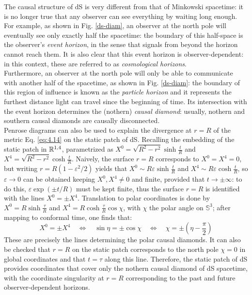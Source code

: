 The causal structure of dS is very different from that of Minkowski spacetime: it is no longer true that any observer can see everything by waiting long enough. For example, as shown in Fig. \ref{ds-diam}, an observer at the north pole will eventually see only exactly half the spacetime: the boundary of this half-space is the observer's \textit{event horizon}, in the sense that signals from beyond the horizon cannot reach them. It is also clear that this event horizon is observer-dependent: in this context, these are referred to as \textit{cosmological horizons}.\\
Furthermore, an observer at the north pole will only be able to communicate with another half of the spacetime, as shown in Fig. \ref{ds-diam}: the boundary of this region of influence is known as the \textit{particle horizon} and it represents the furthest distance light can travel since the beginning of time. Its intersection with the event horizon determines the (nothern) \textit{causal diamond}: usually, nothern and southern causal diamonds are causally disconnected.\\
Penrose diagrams can also be used to explain the divergence at $ r = R $ of the metric Eq. \ref{eq:4.14} on the static patch of dS. Recalling the embedding of the static patch in $ \mathbb{R}^{1,4} $, parametrized as $ X^0 = \sqrt{R^2 - r^2} \sinh \frac{t}{R} $ and $ X^4 = \sqrt{R^2 - r^2} \cosh \frac{t}{R} $. Naively, the surface $ r = R $ corresponds to $ X^0 = X^4 = 0 $, but writing $ r = R ( 1 - \varepsilon^2 / 2) $ yields that $ X^0 \sim R \varepsilon \sinh \frac{t}{R} $ and $ X^4 \sim R \varepsilon \cosh \frac{t}{R} $, so $ \varepsilon \rightarrow 0 $ can be obtained keeping $ X^0, X^4 \neq 0 $ and finite, provided that $ t \rightarrow \pm \infty $: to do this, $ \varepsilon \exp (\pm t / R) $ must be kept finite, thus the surface $ r = R $ is identified with the lines $ X^0 = \pm X^4 $. Translation to polar coordinates is done by $ X^0 = R \sinh \frac{\tau}{R} $ and $ X^4 = R \cosh \frac{\tau}{R} \cos \chi $, with $ \chi $ the polar angle on $ \mathbb{S}^3 $; after mapping to conformal time, one finds that:
\begin{equation*}
  X^0 = \pm X^4
  \quad \Leftrightarrow \quad
  \sin \eta = \pm \cos \chi
  \quad \Leftrightarrow \quad
  \chi = \pm \left( \eta - \frac{\pi}{2} \right)
\end{equation*}
These are precisely the lines determining the polar causal diamonds. It can also be checked that $ r = R $ on the static patch corresponds to the north pole $ \chi = 0 $ in global coordinates and that $ t = \tau $ along this line. Therefore, the static patch of dS provides coordinates that cover only the nothern causal diamond of dS spacetime, with the coordinate singularity at $ r = R $ corresponding to the past and future observer-dependent horizons.


